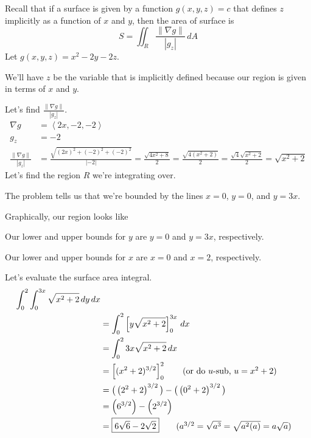 \documentclass{article}
\newcommand{\lrp}[1]{\left( #1 \right)}
\newcommand{\lra}[1]{\left\langle #1 \right\rangle}
\newcommand{\lrb}[1]{\left[ #1 \right]}
\newcommand{\norm}[1]{\left\lVert #1 \right\rVert}
\begin{document}
Recall that if a surface is given by a function $g(x,y,z)=c$ that defines $z$ implicitly as a function of $x$ and $y$, then the area of surface is
\begin{equation*}
    S=\iint_R \frac{\norm{\nabla g}}{\left| g_z\right|}\,dA
\end{equation*}
Let $g(x,y,z)=x^2-2y-2z$. 

We'll have $z$ be the variable that is implicitly defined because our region is given in terms of $x$ and $y$.

Let's find $\displaystyle\frac{\norm{\nabla g}}{\left| g_z\right|} $.
\begin{align*}
    \nabla g&=\lra{2x,-2,-2}\\
    g_z&=-2\\
    \frac{\norm{\nabla g}}{\left| g_z\right|}&=\frac{\sqrt{(2x)^2+(-2)^2+(-2)^2}}{\left|-2\right|}=\frac{\sqrt{4x^2+8}}{2}=\frac{\sqrt{4(x^2+2)}}{2}=\frac{\sqrt{4}\sqrt{x^2+2}}{2}=\sqrt{x^2+2}
\end{align*}
Let's find the region $R$ we're integrating over.

The problem tells us that we're bounded by the lines $x=0$, $y=0$, and $y=3x$.

Graphically, our region looks like \begin{center}
\end{center}

Our lower and upper bounds for $y$ are $y=0$ and $y=3x$, respectively.

Our lower and upper bounds for $x$ are $x=0$ and $x=2$, respectively.

Let's evaluate the surface area integral.
\begin{align*}
    \int_0^2\int_0^{3x}\sqrt{x^2+2}\,dy\,dx\\
    &=\int_0^2\lrb{y\sqrt{x^2+2}}_0^{3x}\,dx\\
    &=\int_0^2 3x\sqrt{x^2+2}\,dx\\
    &=\lrb{(x^2+2)^{3/2}}_0^2\tag{or do $u$-sub, $u=x^2+2$}\\
    &=\big(\lrp{2^2+2}^{3/2}\big)-\big(\lrp{0^2+2}^{3/2}\big)\\
    &=\lrp{6^{3/2}}-\lrp{2^{3/2}}\\
    &=\boxed{6\sqrt{6}-2\sqrt{2}}\tag{$a^{3/2}=\sqrt{a^3}=\sqrt{a^2(a)}=a\sqrt{a}$}
\end{align*}
\end{document}
